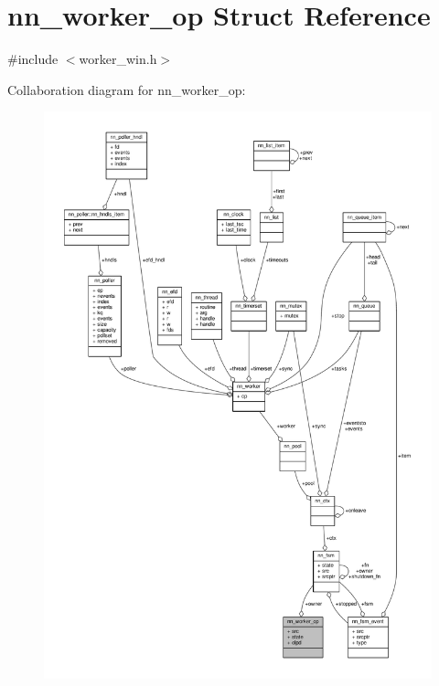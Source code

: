 \hypertarget{structnn__worker__op}{}\section{nn\+\_\+worker\+\_\+op Struct Reference}
\label{structnn__worker__op}


{\ttfamily \#include $<$worker\+\_\+win.\+h$>$}



Collaboration diagram for nn\+\_\+worker\+\_\+op\+:\nopagebreak
\begin{figure}[H]
\begin{center}
\leavevmode
\includegraphics[width=350pt]{structnn__worker__op__coll__graph}
\end{center}
\end{figure}
